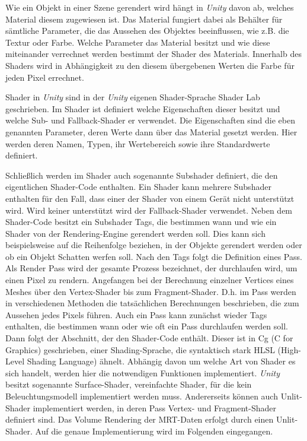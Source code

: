 Wie ein Objekt in einer Szene gerendert wird hängt in \textit{Unity} davon ab, welches Material diesem zugewiesen ist. Das Material fungiert dabei als Behälter für sämtliche Parameter, die das Aussehen des Objektes beeinflussen, wie z.B. die Textur oder Farbe. Welche Parameter das Material besitzt und wie diese miteinander verrechnet werden bestimmt der Shader des Materials. Innerhalb des Shaders wird in Abhängigkeit zu den diesem übergebenen Werten die Farbe für jeden Pixel errechnet. 

Shader in \textit{Unity} sind in der \textit{Unity} eigenen Shader-Sprache Shader Lab geschrieben. Im Shader ist definiert welche Eigenschaften dieser besitzt und welche Sub- und Fallback-Shader er verwendet.
Die Eigenschaften sind die eben genannten Parameter, deren Werte dann über das Material gesetzt werden. Hier werden deren Namen, Typen, ihr Wertebereich sowie ihre Standardwerte definiert. 

Schließlich werden im Shader auch sogenannte Subshader definiert, die den eigentlichen Shader-Code enthalten.
Ein Shader kann mehrere Subshader enthalten für den Fall, dass einer der Shader von einem Gerät nicht unterstützt wird. Wird keiner unterstützt wird der Fallback-Shader verwendet. 
Neben dem Shader-Code besitzt ein Subshader Tags, die bestimmen wann und wie ein Shader von der Rendering-Engine gerendert werden soll. Dies kann sich beispielsweise auf die Reihenfolge beziehen, in der Objekte gerendert werden oder ob ein Objekt Schatten werfen soll. 
Nach den Tags folgt die Definition eines Pass. Als Render Pass wird der gesamte Prozess bezeichnet, der durchlaufen wird, um einen Pixel zu rendern. Angefangen bei der Berechnung einzelner Vertices eines Meshes über den Vertex-Shader bis zum Fragment-Shader. D.h. im Pass werden in verschiedenen Methoden die tatsächlichen Berechnungen beschrieben, die zum Aussehen jedes Pixels führen. 
Auch ein Pass kann zunächst wieder Tags enthalten, die bestimmen wann oder wie oft ein Pass durchlaufen werden soll. 
Dann folgt der Abschnitt, der den Shader-Code enthält. Dieser ist in Cg (C for Graphics)
geschrieben, einer Shading-Sprache, die syntaktisch stark HLSL (High-Level Shading Language) ähnelt. 
Abhängig davon um welche Art von Shader es sich handelt, werden hier die notwendigen Funktionen implementiert. \textit{Unity} besitzt sogenannte Surface-Shader, vereinfachte Shader, für die kein Beleuchtungsmodell implementiert werden muss. Andererseits können auch Unlit-Shader implementiert werden, in deren Pass Vertex- und Fragment-Shader definiert sind. 
Das Volume Rendering der MRT-Daten erfolgt durch einen Unlit-Shader. Auf die genaue Implementierung wird im Folgenden eingegangen. 

